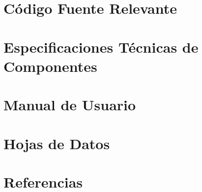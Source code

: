 \documentclass[a4paper,12pt]{report}
\begin{document}
\chapter{Código Fuente Relevante}


\chapter{Especificaciones Técnicas de Componentes}


\chapter{Manual de Usuario}


\chapter{Hojas de Datos}


\chapter*{Referencias}

\end{document}
